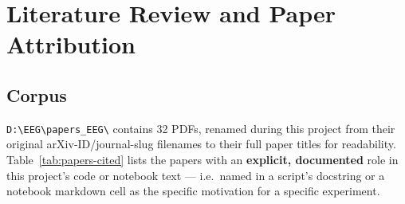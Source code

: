 \documentclass[11pt]{report}
\begin{document}
\chapter{Literature Review and Paper Attribution}
\label{ch:literature}

\section{Corpus}
\texttt{D:\textbackslash EEG\textbackslash papers\_EEG\textbackslash} contains 32 PDFs, renamed
during this project from their original arXiv-ID/journal-slug filenames to
their full paper titles for readability. Table~\ref{tab:papers-cited} lists
the papers with an \textbf{explicit, documented} role in this project's code
or notebook text --- i.e.\ named in a script's docstring or a notebook
markdown cell as the specific motivation for a specific experiment.
\end{document}
